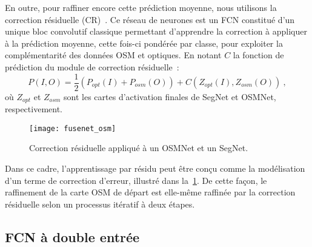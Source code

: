 En outre, pour raffiner encore cette prédiction moyenne, nous utilisons la correction résiduelle (CR)~\cite{audebert_semantic_2016}. Ce réseau de neurones est un FCN constitué d'un unique bloc convolutif classique permettant d'apprendre la correction à appliquer à la prédiction moyenne, cette fois-ci pondérée par classe, pour exploiter la complémentarité des données OSM et optiques. En notant $C$ la fonction de prédiction du module de correction résiduelle~:
\begin{equation}
P(I, O) = \frac{1}{2} (P_{opt}(I) + P_{osm}(O)) + C(Z_{opt}(I), Z_{osm}(O))~,
\end{equation}
où $Z_{opt}$ et $Z_{osm}$ sont les cartes d'activation finales de SegNet et OSMNet, respectivement.

\begin{figure}[t]
  \centering
  \texttt{[image: fusenet\_osm]}
  \caption{Correction résiduelle appliqué à un OSMNet et un SegNet.}
  \label{fig:refinet}
\end{figure}

Dans ce cadre, l'apprentissage par résidu peut être conçu comme la modélisation d'un terme de correction d'erreur, illustré dans la~\cref{fig:refinet}. De cette façon, le raffinement de la carte OSM de départ est elle-même raffinée par la correction résiduelle selon un processus itératif à deux étapes.

\subsection{FCN à double entrée}

